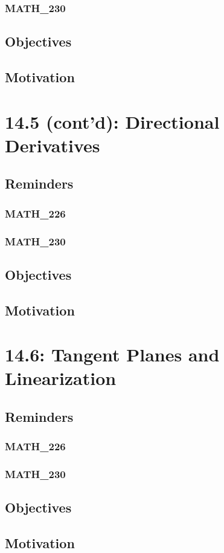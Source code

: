 \documentclass{report}
\begin{document}
\begin{sloppypar}
\subsection{MATH\_230}
\section{Objectives}
\section{Motivation}
\chapter{14.5 (cont'd): Directional Derivatives}
\section{Reminders}
\subsection{MATH\_226}
\subsection{MATH\_230}
\section{Objectives}
\section{Motivation}
\chapter{14.6: Tangent Planes and Linearization}
\section{Reminders}
\subsection{MATH\_226}
\subsection{MATH\_230}
\section{Objectives}
\section{Motivation}

\end{sloppypar}
\end{document}
